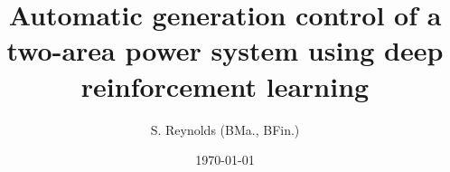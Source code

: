 \documentclass[12pt,oneside]{book}
\begin{document}
    \onehalfspace
  
    \title{Automatic generation control of a two-area power system using deep reinforcement learning} 
    \author{S. Reynolds (BMa., BFin.)}
    
    \date{\today} 
    
    
    
    

    \frontmatter
    \maketitle
    \declaration
    

    \cleardoublepage
     {} 
    \tableofcontents

	\cleardoublepage
	 \label{listoffigures}
	\listoffigures
	
	\cleardoublepage
	 \label{listoftables} 
	\listoftables


	
    \cleardoublepage
    \mainmatter
\end{document}
